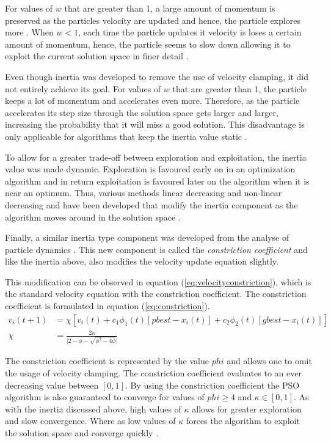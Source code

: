 For values of $w$ that are greater than 1, a large amount of momentum is preserved as the particles velocity are updated and hence, the particle explores more \cite{FundamentalSwarm}. When $w < 1$, each time the particle updates it velocity is loses a certain amount of momentum, hence, the particle seems to slow down allowing it to exploit the current solution space in finer detail \cite{FundamentalSwarm}.

Even though inertia was developed to remove the use of velocity clamping, it did not entirely achieve its goal. For values of $w$ that are greater than 1, the particle keeps a lot of momentum and accelerates even more. Therefore, as the particle accelerates its step size through the solution space gets larger and larger, increasing the probability that it will miss a good solution. This disadvantage is only applicable for algorithms that keep the inertia value static \cite{CompuIntelligenceIntro,FundamentalSwarm}.

To allow for a greater trade-off between exploration and exploitation, the inertia value was made dynamic. Exploration is favoured early on in an optimization algorithm and in return exploitation is favoured later on the algorithm when it is near an optimum. Thus, various methods linear decreasing and non-linear decreasing and have been developed that modify the inertia component as the algorithm moves around in the solution space \cite{CompuIntelligenceIntro,FundamentalSwarm}.

Finally, a similar inertia type component was developed from the analyse of particle dynamics \cite{FundamentalSwarm}. This new component is called the \emph{constriction coefficient} and like the inertia above, also modifies the velocity update equation slightly\cite{adaptPSO,FundamentalSwarm,CompuIntelligenceIntro}. 

This modification can be observed in equation (\ref{eq:velocityconstriction}), which is the standard velocity equation with the constriction coefficient. The constriction coefficient is formulated in equation (\ref{eq:constriction})\cite{adaptPSO,FundamentalSwarm,CompuIntelligenceIntro}.
\begin{align}
v_i(t+1) &= \chi[v_i(t) + c_1\phi_{1}(t)[pbest - x_i(t)] + c_2\phi_{2}(t)[gbest - x_i(t)]]\label{eq:velocityconstriction}\\
\chi &= \frac{2\kappa}{\lvert 2 - \phi - \sqrt{\phi^2 - 4\phi}\rvert}\label{eq:constriction}
\end{align}

The constriction coefficient is represented by the value $phi$ and allows one to omit the usage of velocity clamping. The constriction coefficient evaluates to an ever decreasing value between $[0,1]$. By using the constriction coefficient the PSO algorithm is also guaranteed to converge for values of $phi \geq 4$ and $\kappa \in [0,1]$. As with the inertia discussed above, high values of $\kappa$ allows for greater exploration and slow convergence. Where as low values of $\kappa$ forces the algorithm to exploit the solution space and converge quickly \cite{adaptPSO,FundamentalSwarm,CompuIntelligenceIntro}.
